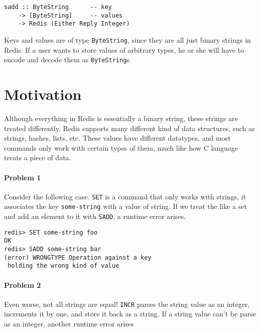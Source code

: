 \documentclass[pldi]{sigplanconf-pldi16}
\begin{document}
\begin{verbatim}
sadd :: ByteString      -- key
    -> [ByteString]     -- values
    -> Redis (Either Reply Integer)
\end{verbatim}

Keys and values are of type \texttt{ByteString}, since they are all
 just binary strings in Redis. If a user wants to store values of
 arbitrary types, he or she will have to encode and decode them as
 \texttt{ByteString}s.


\section{Motivation}


Although everything in Redis is essentially a binary string, these strings are
 treated differently. Redis supports many different kind of data structures,
 such as strings, hashes, lists, etc. These values have different datatypes,
 and most commands only work with certain types of them, much like how C
 language treats a piece of data.

\paragraph{Problem 1} Consider the following case. \texttt{SET} is
 a command that only works with strings, it associates the key
 \texttt{some-string} with a value of string. If we treat the like a
 set and add an element to it with \texttt{SADD}, a runtime error
 arises.

\begin{verbatim}
redis> SET some-string foo
OK
redis> SADD some-string bar
(error) WRONGTYPE Operation against a key
 holding the wrong kind of value
\end{verbatim}

\paragraph{Problem 2} Even worse, not all strings are equal!
 \texttt{INCR} parses the string value as an integer, increments it by
 one, and store it back as a string. If a string value can't be parse as an
 integer, another runtime error arises
\end{document}
